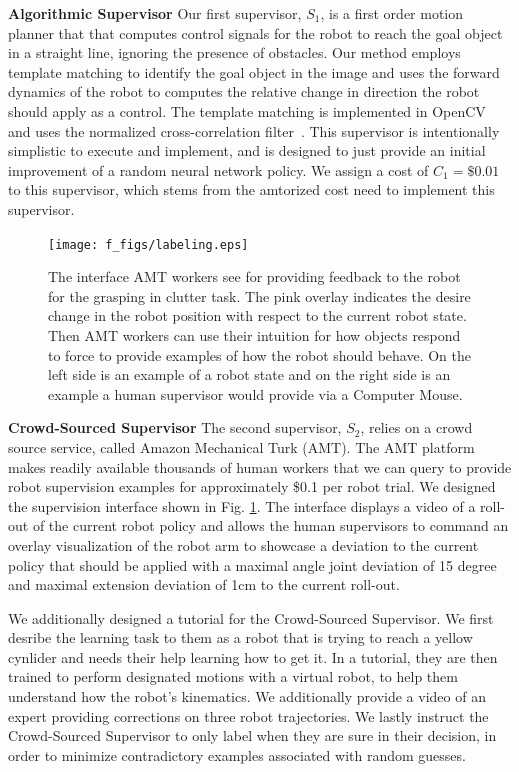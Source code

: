 \documentclass[10pt, conference]{ieeeconf}      %
\begin{document}
\noindent \textbf{Algorithmic Supervisor} Our first supervisor, $S_1$, is a first order motion planner that that computes
control signals for the robot to reach the goal object in a straight line, ignoring the presence of obstacles. Our
method employs template matching to identify the goal object in the image and uses the forward dynamics of the robot to
computes the relative change in direction the robot should apply as a control. The template matching is implemented in
OpenCV and uses the normalized cross-correlation filter~\cite{opencv_library}. This supervisor is intentionally
simplistic to execute and implement, and is designed to just provide an initial improvement of a random neural network policy.
We assign a cost of $C_1 = \$0.01$ to this supervisor, which stems from the amtorized cost need to implement this supervisor. 
\begin{figure}[t]
\centering

\texttt{[image: f\_figs/labeling.eps]}

\caption{\footnotesize  The interface AMT workers see for providing feedback to the robot for the grasping in clutter task. The pink overlay indicates the desire change in the robot position with respect to the current robot state. Then AMT workers can use their intuition for how objects respond to force to provide examples of how the robot should behave. On the left side is an example of a robot state and on the right side is an example a human supervisor would provide via a Computer Mouse.}
\vspace*{-10pt}
\label{fig:overlays}
\end{figure}

\noindent \textbf{Crowd-Sourced Supervisor} The second supervisor, $S_2$, relies on a crowd source service, called Amazon
Mechanical Turk (AMT). The AMT platform makes readily available thousands of human workers that we can query to provide robot
supervision examples for approximately \$0.1 per robot trial. 
We designed the supervision interface shown in Fig. \ref{fig:overlays}. The interface displays a video of a roll-out of
the current robot policy and allows the human supervisors to command an overlay visualization of the robot arm to
showcase a deviation to the current policy that should be applied with a maximal angle joint deviation of 15 degree and maximal extension deviation of 1cm  to
the current roll-out.

We additionally designed a tutorial for the Crowd-Sourced Supervisor. We first desribe the learning task to them as a
robot that is trying to reach a yellow cynlider and needs their help learning how to get it. In a tutorial, they are then trained
to perform designated motions with a virtual robot, to help them understand how the robot's kinematics. We additionally
provide a video of an expert providing corrections on three robot trajectories. We lastly instruct the Crowd-Sourced
Supervisor to only label when they are sure in their decision, in order to minimize contradictory examples associated
with random guesses.  
\end{document}
